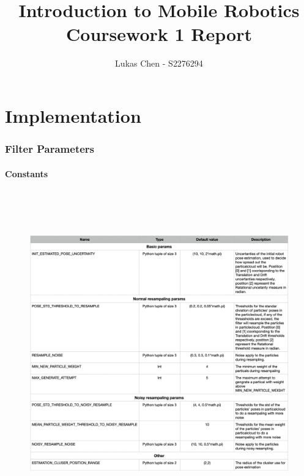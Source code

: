 \documentclass[11pt,a4paper]{article}
\title{Introduction to Mobile Robotics Coursework 1 Report}
\author{Lukas Chen - S2276294}
\begin{document}
\newpage
\part{Implementation}
  \section{Filter Parameters}
    \subsection{Constants}
      \begin{figure}[h]
        \centering
        \includegraphics[width=16cm, height=14cm]{Const.png}
      \end{figure}
\end{document}
